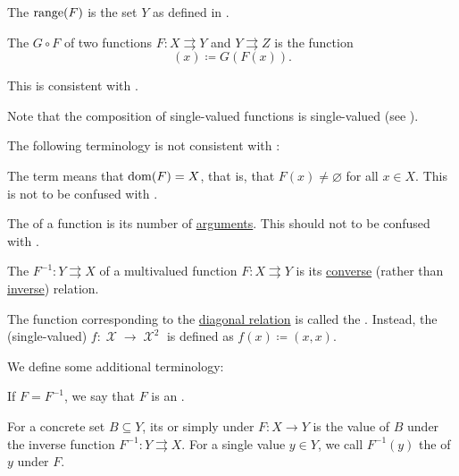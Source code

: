 \begin{definition}
\begin{defenum}[resume=def:function]
     The  \( \operatorname{range}(F) \) is the set \( Y \) as defined in .

     The  \( G \circ F \) of two functions \( F: X \rightrightarrows Y \) and \( Y \rightrightarrows Z \) is the function
    \begin{equation*}
      [G \circ F](x) \coloneqq G(F(x)).
    \end{equation*}

    This is consistent with .

    Note that the composition of single-valued functions is single-valued (see ).
  \end{defenum}

  The following terminology is not consistent with :
  \begin{defenum}[resume=def:function]
     The term  means that \( \operatorname{dom}(F) = X \), that is, that \( F(x) \neq \varnothing \) for all \( x \in X \). This is not to be confused with .

     The  of a function is its number of \hyperref[def:function/arity]{arguments}. This should not to be confused with .

     The  \( F^{-1}: Y \rightrightarrows X \) of a multivalued function \( F: X \rightrightarrows Y \) is its \hyperref[def:binary_relation/converse]{converse} (rather than \hyperref[def:binary_relation/inverse]{inverse}) relation.

     The function corresponding to the \hyperref[def:binary_relation/diagonal]{diagonal relation} is called the . Instead, the (single-valued)  \( f: \mscrX \to \mscrX^2 \) is defined as \( f(x) \coloneqq (x, x) \).
  \end{defenum}

  We define some additional terminology:
  \begin{defenum}[resume=def:function]
     If \( F = F^{-1} \), we say that \( F \) is an .

     For a concrete set \( B \subseteq Y \), its  or simply  under \( F: X \to Y \) is the value of \( B \) under the inverse function \( F^{-1}: Y \rightrightarrows X \). For a single value \( y \in Y \), we call \( F^{-1}(y) \) the  of \( y \) under \( F \).


\end{defenum}
\end{definition}
